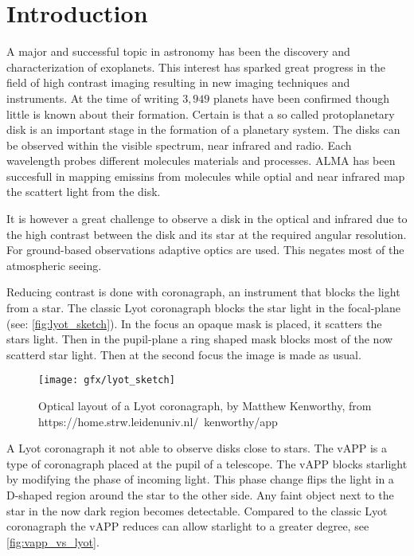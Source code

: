 
\chapter{Introduction} %

\label{ch:intro} %


A major and successful topic in astronomy has been the discovery and characterization of exoplanets. This interest has sparked great progress in the field of high contrast imaging resulting in new imaging techniques and instruments. At the time of writing $3,949$ planets have been confirmed though little is known about their formation. Certain is that a so called protoplanetary disk is an important stage in the formation of a planetary system. The disks can be observed within the visible spectrum, near infrared and radio. Each wavelength probes different molecules materials and processes. ALMA has been succesfull in mapping emissins from molecules while optial and near infrared map the scattert light from the disk.

It is however a great challenge to observe a disk in the optical and infrared due to the high contrast between the disk and its star at the required angular resolution. For ground-based observations adaptive optics are used. This negates most of the atmospheric seeing.

Reducing contrast is done with coronagraph, an instrument that blocks the light from a star. The classic Lyot coronagraph blocks the star light in the focal-plane (see: \autoref{fig:lyot_sketch}). In the focus an opaque mask is placed, it scatters the stars light. Then in the pupil-plane a ring shaped mask blocks most of the now scatterd star light. Then at the second focus the image is made as usual.

\begin{figure}
    \texttt{[image: gfx/lyot\_sketch]}
    \caption{Optical layout of a Lyot coronagraph, by Matthew Kenworthy, from https://home.strw.leidenuniv.nl/~kenworthy/app}
    \label{fig:lyot_sketch}
\end {figure}

A Lyot coronagraph it not able to observe disks close to stars. The \ac{vAPP} \cite{vapp_snik} is a type of coronagraph placed at the pupil of a telescope. The \ac{vAPP} blocks starlight by modifying the phase of incoming light. This phase change flips the light in a D-shaped region around the star to the other side. Any faint object next to the star in the now dark region becomes detectable. Compared to the classic Lyot coronagraph the \ac{vAPP} reduces can allow  starlight to a greater degree, see \autoref{fig:vapp_vs_lyot}.  

